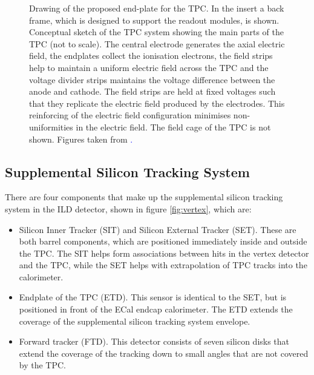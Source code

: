 \begin{figure}[h!]
\caption[\protect{} Drawing of the proposed end-plate for the TPC.  In the insert a back frame, which is designed to support the readout modules, is shown.  \protect{} Conceptual sketch of the TPC system showing the main parts of the TPC (not to scale).  The central electrode generates the axial electric field, the endplates collect the ionisation electrons, the field strips help to maintain a uniform electric field across the TPC and the voltage divider strips maintains the voltage difference between the anode and cathode.  The field strips are held at fixed voltages such that they replicate the electric field produced by the electrodes.  This reinforcing of the electric field configuration minimises non-uniformities in the electric field.  The field cage of the TPC is not shown.  Figures taken from  \cite{Behnke:2013lya}\textcolor{blue}{.}]{\protect{} Drawing of the proposed end-plate for the TPC.  In the insert a back frame, which is designed to support the readout modules, is shown.  \protect{} Conceptual sketch of the TPC system showing the main parts of the TPC (not to scale).  The central electrode generates the axial electric field, the endplates collect the ionisation electrons, the field strips help to maintain a uniform electric field across the TPC and the voltage divider strips maintains the voltage difference between the anode and cathode.  The field strips are held at fixed voltages such that they replicate the electric field produced by the electrodes.  This reinforcing of the electric field configuration minimises non-uniformities in the electric field.  The field cage of the TPC is not shown.  Figures taken from  \cite{Behnke:2013lya}\textcolor{blue}{.}}
\label{fig:tracker}
\end{figure} 


\subsection{Supplemental Silicon Tracking System}
There are four components that make up the supplemental silicon tracking system in the ILD detector, shown in figure \ref{fig:vertex}, which are:
\begin{itemize}
\item Silicon Inner Tracker (SIT) and Silicon External Tracker (SET).  These are both barrel components, which are positioned immediately inside and outside the TPC.  The SIT helps form associations between hits in the vertex detector and the TPC, while the SET helps with extrapolation of TPC tracks into the calorimeter.  
\item Endplate of the TPC (ETD).  This sensor is identical to the SET, but is positioned in front of the ECal endcap calorimeter.  The ETD extends the coverage of the supplemental silicon tracking system envelope. 
\item Forward tracker (FTD).  This detector consists of seven silicon disks that extend the coverage of the tracking down to small angles that are not covered by the TPC.  
\end{itemize}

